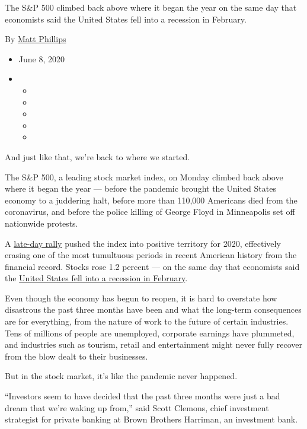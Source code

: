 The S\&P 500 climbed back above where it began the year on the same day
that economists said the United States fell into a recession in
February.

By \href{https://www.nytimes3xbfgragh.onion/by/matt-phillips}{Matt
Phillips}

\begin{itemize}
\item
  June 8, 2020
\item
  \begin{itemize}
  \item
  \item
  \item
  \item
  \item
  \end{itemize}
\end{itemize}

And just like that, we're back to where we started.

The S\&P 500, a leading stock market index, on Monday climbed back above
where it began the year --- before the pandemic brought the United
States economy to a juddering halt, before more than 110,000 Americans
died from the coronavirus, and before the police killing of George Floyd
in Minneapolis set off nationwide protests.

A
\href{https://www.nytimes3xbfgragh.onion/2020/06/08/business/stock-market-today-coronavirus.html}{late-day
rally} pushed the index into positive territory for 2020, effectively
erasing one of the most tumultuous periods in recent American history
from the financial record. Stocks rose 1.2 percent --- on the same day
that economists said the
\href{https://www.nytimes3xbfgragh.onion/2020/06/08/business/economy/us-economy-recession-2020.html}{United
States fell into a recession in February}.

Even though the economy has begun to reopen, it is hard to overstate how
disastrous the past three months have been and what the long-term
consequences are for everything, from the nature of work to the future
of certain industries. Tens of millions of people are unemployed,
corporate earnings have plummeted, and industries such as tourism,
retail and entertainment might never fully recover from the blow dealt
to their businesses.

But in the stock market, it's like the pandemic never happened.

``Investors seem to have decided that the past three months were just a
bad dream that we're waking up from,'' said Scott Clemons, chief
investment strategist for private banking at Brown Brothers Harriman, an
investment bank.

